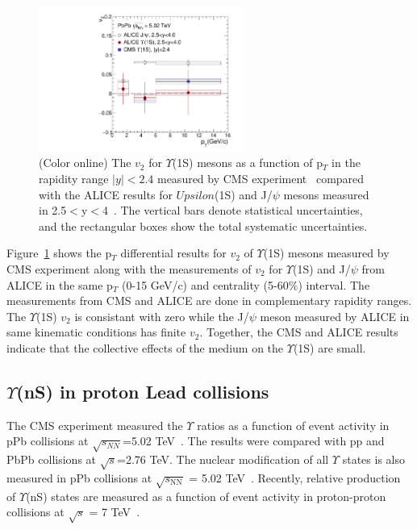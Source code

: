 \begin{figure}
  \begin{center}
\includegraphics[width=0.6\textwidth]{Figures/ExpOverview/Fig_CMS_ALICE_Y1S_5TeV_V2.pdf}
\caption{(Color online) The $v_{2}$ for $\Upsilon$(1S) mesons as a function of p$_{T}$ in the
  rapidity range $|y|<2.4$ measured by
  CMS experiment~\cite{CMS:2020efs} compared with the ALICE results for $Upsilon$(1S)
  and J/$\psi$ mesons measured in 2.5$<$y$<$4~\cite{ALICE:2019pox}.
  The vertical bars denote statistical uncertainties,
  and the rectangular boxes show the total systematic uncertainties.
}
\label{fig:Upsilon1SV2Compare}
\end{center}
\end{figure}

Figure~\ref{fig:Upsilon1SV2Compare} shows the p$_{T}$ differential results
for $v_{2}$ of $\Upsilon$(1S) mesons measured by CMS experiment along with the
measurements of $v_{2}$ for $\Upsilon$(1S) and J/$\psi$ from ALICE in the same
p$_{T}$ (0-15 GeV/c) and centrality (5-60$\%$) interval. The measurements from CMS
and ALICE are done in complementary rapidity ranges. The $\Upsilon$(1S) $v_{2}$ is
consistant with zero while the J/$\psi$ meson measured by ALICE in same kinematic
conditions has finite $v_{2}$. Together, the CMS and ALICE
results indicate that the collective effects of the medium on the 
$\Upsilon$(1S) are small.



\subsection{$\Upsilon$(nS) in proton Lead collisions }

The CMS experiment measured the $\Upsilon$ ratios as a function of event activity  
in pPb collisions at $\sqrt{s_{NN}}$=5.02 TeV~\cite{CMS:2013jsu}.
The results were compared with pp and PbPb collisions at $\sqrt{s}$=2.76 TeV.
 The nuclear modification of all $\Upsilon$ states is also measured in pPb collisions
 at $\sqrt{s_\mathrm{NN}}$ = 5.02 TeV~\cite{CMS:2022wfi}.
 Recently, relative production of $\Upsilon$(nS) states are measured as a function of
 event activity in proton-proton collisions at $ \sqrt{s} $ = 7 TeV~\cite{CMS:2020fae}.

